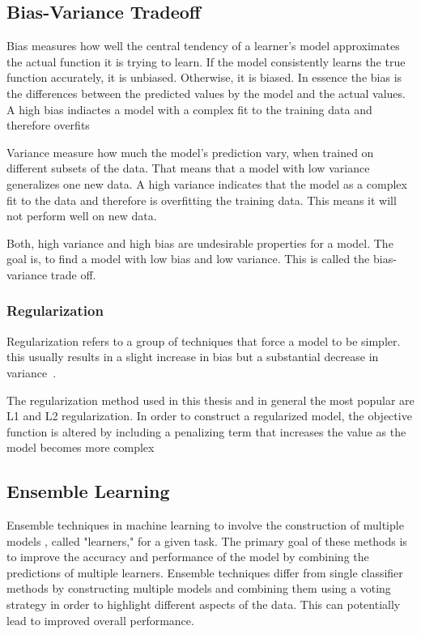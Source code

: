 \subsection{Bias-Variance Tradeoff}\label{subsec:bias-variance-tradeoff}
Bias measures how well the central tendency of a learner's model approximates the
actual function
it is trying to learn. If the model consistently learns the true function accurately,
it is
unbiased. Otherwise, it is biased. \cite[p. 7-8]{neal_biasvariancetradeofftextbooks_2019}
In essence the bias is the differences between the predicted values by the model and
the actual
values.
A high bias indiactes a model with a complex fit to the training data and therefore
overfits
\cite[p. 20]{neal_biasvariancetradeofftextbooks_2019}

Variance measure how much the model's prediction vary, when trained on different
subsets of the
data. That means that a model with low variance generalizes one new data. A high variance
indicates that the model as a complex fit to the data and therefore is overfitting the
training
data. This means it will not perform well on new data. \cite[p.
7-8]{neal_biasvariancetradeofftextbooks_2019}

Both, high variance and high bias are undesirable properties for a model. The goal is,
to find a
model with low bias and low variance. This is called the bias-variance trade off. \cite[p.
9]{neal_biasvariancetradeofftextbooks_2019}

\subsubsection*{Regularization}
Regularization refers to a group of techniques that force a model to be simpler.
this usually results in a slight increase in bias but a substantial decrease in
variance~\cite[p.
12]{burkov2019hundred}.

The regularization method used in this thesis and in general the most popular are L1
and L2
regularization.
In order to construct a regularized model, the objective function is altered by
including a
penalizing term that increases the value as the model becomes more complex~\cite[p.
12]{burkov2019hundred}

\subsection{Ensemble Learning}\label{subsec:ensemble-learning}
Ensemble techniques in machine learning to involve the construction of multiple models
, called
"learners," for a given task. The primary goal of these methods is to improve the
accuracy and
performance of the model by combining the predictions of multiple learners. Ensemble
techniques
differ from single classifier methods by constructing multiple models and combining
them using a
voting strategy in order to highlight different aspects of the data. This can
potentially lead to
improved overall performance. \cite[p. 253]{shaik_briefsurveyrandom_2019}

